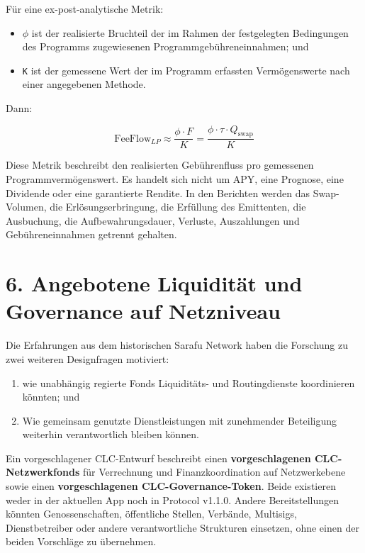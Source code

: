 \documentclass[11pt]{article}
\begin{document}
Für eine ex-post-analytische Metrik:

\begin{itemize}[leftmargin=*]
\item \texttt{$\phi$} ist der realisierte Bruchteil der im Rahmen der festgelegten Bedingungen des Programms zugewiesenen Programmgebühreneinnahmen; und
\item \texttt{K} ist der gemessene Wert der im Programm erfassten Vermögenswerte nach einer angegebenen Methode.
\end{itemize}
Dann:

\[
\mathrm{FeeFlow}_{LP} \approx \frac{\phi \cdot F}{K} = \frac{\phi \cdot \tau \cdot Q_{\mathrm{swap}}}{K}
\]

Diese Metrik beschreibt den realisierten Gebührenfluss pro gemessenen Programmvermögenswert. Es handelt sich nicht um APY, eine Prognose, eine Dividende oder eine garantierte Rendite. In den Berichten werden das Swap-Volumen, die Erlösungserbringung, die Erfüllung des Emittenten, die Ausbuchung, die Aufbewahrungsdauer, Verluste, Auszahlungen und Gebühreneinnahmen getrennt gehalten.


\section*{6. Angebotene Liquidität und Governance auf Netzniveau}

Die Erfahrungen aus dem historischen Sarafu Network haben die Forschung zu zwei weiteren Designfragen motiviert:

\begin{enumerate}[leftmargin=*]
\item wie unabhängig regierte Fonds Liquiditäts- und Routingdienste koordinieren könnten; und
\item Wie gemeinsam genutzte Dienstleistungen mit zunehmender Beteiligung weiterhin verantwortlich bleiben können.
\end{enumerate}
Ein vorgeschlagener CLC-Entwurf beschreibt einen \textbf{vorgeschlagenen CLC-Netzwerkfonds } für Verrechnung und Finanzkoordination auf Netzwerkebene sowie einen \textbf{ vorgeschlagenen CLC-Governance-Token}. Beide existieren weder in der aktuellen App noch in Protocol v1.1.0. Andere Bereitstellungen könnten Genossenschaften, öffentliche Stellen, Verbände, Multisigs, Dienstbetreiber oder andere verantwortliche Strukturen einsetzen, ohne einen der beiden Vorschläge zu übernehmen.
\end{document}
